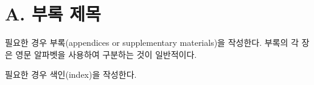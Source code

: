 \documentclass[11pt]{report}
\begin{document}

\normalsize
{} 
\section*{A. 부록 제목} %
필요한 경우 부록(appendices or supplementary materials)을 작성한다.
부록의 각 장은 영문 알파벳을 사용하여 구분하는 것이 일반적이다.


\renewcommand{\indexname}{색인}
\printindex
\bigskip

필요한 경우 색인(index)을 작성한다.
\end{document}
